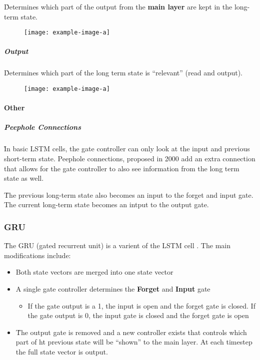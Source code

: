 \r{Determines which part of the output from the \textbf{main layer} are kept in the long-term state.}

\begin{figure}
	\centering
	\texttt{[image: example-image-a]}\hfil
	\caption{}
\end{figure}

\subparagraph{Output}

\r{Determines which part of the long term state is ``relevant'' (read and output).}

\begin{figure}
	\centering
	\texttt{[image: example-image-a]}\hfil
	\caption{}
\end{figure}


\paragraph{Other}

\subparagraph{Peephole Connections}

\r{In basic LSTM cells, the gate controller can only look at the input and previous short-term state. Peephole connections, proposed in 2000  add an extra connection that allows for the gate controller to also see information from the long term state as well. }

\r{The previous long-term state also becomes an input to the forget and input gate. The current long-term state becomes an intput to the output gate.}



\subsubsection{GRU}

\r{The GRU (gated recurrent unit) is a varient of the LSTM cell . The main modifications include:}

\begin{itemize}[noitemsep,topsep=0pt]
	\item Both state vectors are merged into one state vector
	\item A single gate controller determines the \textbf{Forget} and \textbf{Input} gate
	\begin{itemize}[noitemsep,topsep=0pt]
		\item If the gate output is a 1, the input is open and the forget gate is closed. If the gate output is 0, the input gate is closed and the forget gate is open
	\end{itemize}
	\item \r{The output gate is removed and a new controller exists that controls which part of ht previous state will be ``shown'' to the main layer}. At each timestep the full state vector is output.
\end{itemize}



